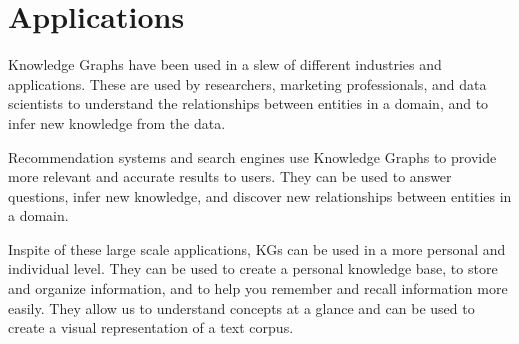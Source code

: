 \section{Applications}

Knowledge Graphs have been used in  a slew of different industries and applications. These are used by researchers, marketing professionals, and data scientists to understand the relationships between entities in a domain, and to infer new knowledge from the data.

Recommendation systems and search engines use Knowledge Graphs to provide more relevant and accurate results to users. They can be used to answer questions, infer new knowledge, and discover new relationships between entities in a domain.

Inspite of these large scale applications, KGs can be used in a more personal and individual level. They can be used to create a personal knowledge base, to store and organize information, and to help you remember and recall information more easily.
They allow us to understand concepts at a glance and can be used to create a visual representation of a text corpus.

